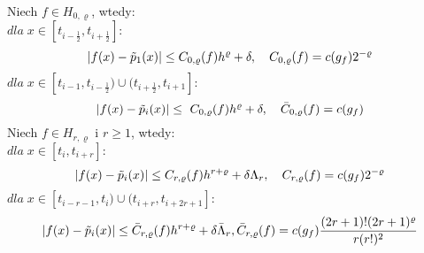 \documentclass[oik, pdftex, robocza, man]{mgrwms}
\begin{document}
    \begin{lemma} \label{lem:algMP_2}
        Niech $f \in H_{0, \varrho}$, wtedy: \\
        $dla \; x \in [t_{i-\frac{1}{2}}, t_{i + \frac{1}{2}}] :$
        \begin{equation*}
            |f(x) - \tilde{p}_{1}(x)| \leq C_{0, \varrho}(f) h^{\varrho} + \delta, \quad C_{0, \varrho}(f) = c(g_{f}) 2^{-\varrho} \\
        \end{equation*}
        $dla \; x \in [t_{i-1}, t_{i - \frac{1}{2}}) \cup (t_{i + \frac{1}{2}}, t_{i+1}]  :$
        \begin{equation*}
            |f(x) - \tilde{p}_{i}(x)| \leq \ {C} _{0, \varrho}(f) h^{\varrho}  + \delta, \quad \bar{C} _{0, \varrho}(f) = c(g_{f}) \\
        \end{equation*}
        Niech $f \in H_{r, \varrho}$ i $r \geq 1$, wtedy: \\
        $dla \; x \in [t_{i}, t_{i + r}] : $
        \begin{equation*}
            |f(x) - \tilde{p}_{i}(x)| \leq C_{r, \varrho}(f) h^{r+\varrho} + \delta\Lambda_{r}, \quad C_{r, \varrho}(f) = c(g_{f}) 2^{-\varrho} \\
        \end{equation*}
        $dla \; x \in [t_{i-r-1}, t_{i}) \cup (t_{i + r}, t_{i+2r+1}]  :$
        \begin{equation*}
            |f(x) - \tilde{p}_{i}(x)| \leq \bar{C} _{r, \varrho}(f) h^{r+\varrho} + \delta\bar{\Lambda}_{r}, \bar{C} _{r, \varrho}(f) = c(g_{f}) \frac{(2r+1)!(2r+1)^{\varrho}}{r(r!)^{2}} \\
        \end{equation*}
    \end{lemma}
\end{document}
